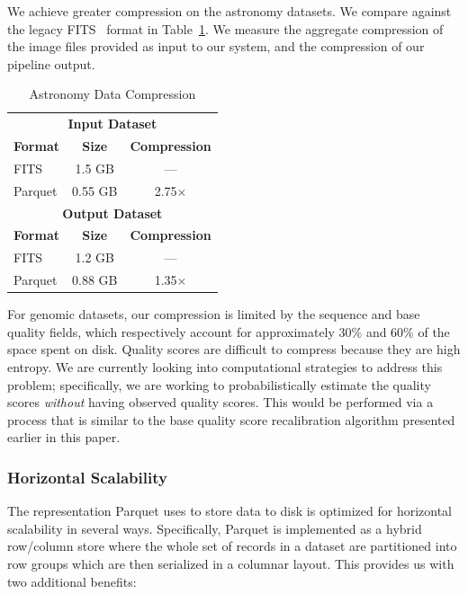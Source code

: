 \documentclass{acm_proc_article-sp}
\begin{document}
We achieve greater compression on the astronomy datasets. We compare against the legacy FITS~\cite{wells81}
format in Table~\ref{tab:astro-compression}. We measure the aggregate compression of the image files provided
as input to our system, and the compression of our pipeline output.

\begin{table}[h]
\caption{Astronomy Data Compression}
\label{tab:astro-compression}
\begin{center}
\begin{tabular}{ l c c }
\hline
\multicolumn{3}{c}{\bf Input Dataset} \\
\bf Format & \bf Size & \bf Compression \\
\hline
\hline
FITS & 1.5 GB & --- \\
Parquet & 0.55 GB & 2.75$\times$ \\
\hline
\multicolumn{3}{c}{\bf Output Dataset} \\
\bf Format & \bf Size & \bf Compression \\
\hline
\hline
FITS & 1.2 GB & --- \\
Parquet & 0.88 GB & 1.35$\times$ \\
\hline
\end{tabular}
\end{center}
\end{table}

For genomic datasets, our compression is limited by the sequence and base quality fields, which respectively
account for approximately 30\% and 60\% of the space spent on disk. Quality scores are difficult to compress
because they are high entropy. We are currently looking into computational strategies to address this problem;
specifically, we are working to probabilistically estimate the quality scores \emph{without} having observed quality
scores. This would be performed via a process that is similar to the base quality score recalibration algorithm
presented earlier in this paper.

\subsubsection{Horizontal Scalability}
\label{sec:horizontal-scalability}

The representation Parquet uses to store data to disk is optimized for horizontal scalability in several ways.
Specifically, Parquet is implemented as a hybrid row/column store where the whole set of records in a dataset
are partitioned into row groups which are then serialized in a columnar layout. This provides us with two additional
benefits:
\end{document}
